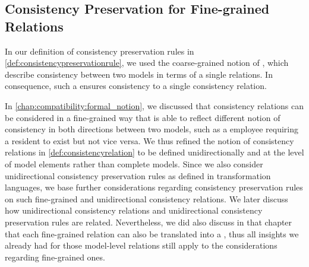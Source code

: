 

\subsection{Consistency Preservation for Fine-grained Relations}

In our definition of consistency preservation rules in \autoref{def:consistencypreservationrule}, we used the coarse-grained notion of \modellevelconsistencyrelations, which describe consistency between two models in terms of a single relations.
In consequence, such a \modellevelconsistencypreservationrule ensures consistency to a single consistency relation.

In \autoref{chap:compatibility:formal_notion}, we discussed that consistency relations can be considered in a fine-grained way that is able to reflect different notion of consistency in both directions between two models, such as a employee requiring a resident to exist but not vice versa.
We thus refined the notion of consistency relations in \autoref{def:consistencyrelation} to be defined unidirectionally and at the level of model elements rather than complete models.
Since we also consider unidirectional consistency preservation rules as defined in transformation languages, we base further considerations regarding consistency preservation rules on such fine-grained and unidirectional consistency relations.
We later discuss how unidirectional consistency relations and unidirectional consistency preservation rules are related.
Nevertheless, we did also discuss in that chapter that each fine-grained relation can also be translated into a \modellevelconsistencyrelation, thus all insights we already had for those model-level relations still apply to the considerations regarding fine-grained ones.

